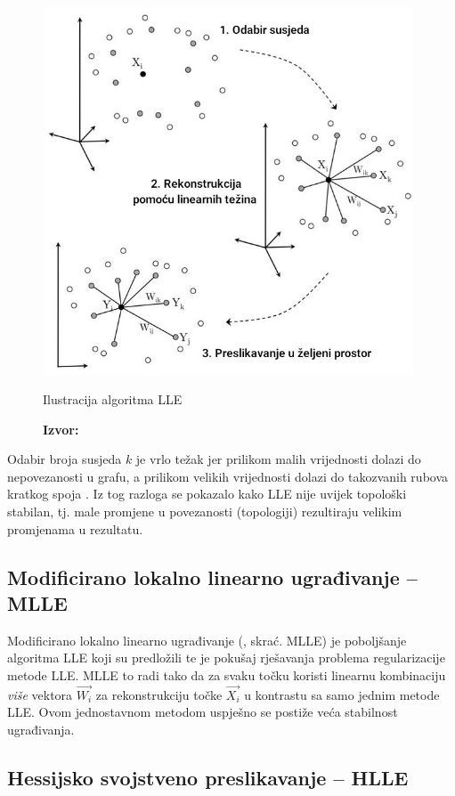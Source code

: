 \documentclass[times, utf8, diplomski]{fer}
\newcommand*{\captionsource}[2]{            %
    \RawFloats
    \caption{#1}
    \caption*{\textbf{Izvor:} #2}
}
\begin{document}
\begin{figure}[htb]
    \centering
    \includegraphics[width=11cm]{resources/images/reduction/lle_steps.jpg}
    \captionsource{Ilustracija algoritma LLE}{\cite{saul2003think}}
    \label{fig:lle_steps}
\end{figure}

Odabir broja susjeda $k$ je vrlo težak jer prilikom malih vrijednosti dolazi do nepovezanosti u grafu, a prilikom velikih vrijednosti dolazi do takozvanih rubova kratkog spoja \citep{balasubramanian2002isomap}.
Iz tog razloga se pokazalo kako LLE nije uvijek topološki stabilan, tj. male promjene u povezanosti (topologiji) rezultiraju velikim promjenama u rezultatu.
\newpage

\subsection{Modificirano lokalno linearno ugrađivanje -- MLLE}

Modificirano lokalno linearno ugrađivanje (, skrać. MLLE) je poboljšanje algoritma LLE koji su predložili \cite{zhang2007mlle} te je pokušaj rješavanja problema regularizacije metode LLE. MLLE to radi tako da za svaku točku koristi linearnu kombinaciju \emph{više} vektora $\vec{W_{i}}$ za rekonstrukciju točke $\vec{X_i}$ u kontrastu sa samo jednim metode LLE. Ovom jednostavnom metodom uspješno se postiže veća stabilnost ugrađivanja.

\subsection{Hessijsko svojstveno preslikavanje -- HLLE}
\end{document}
